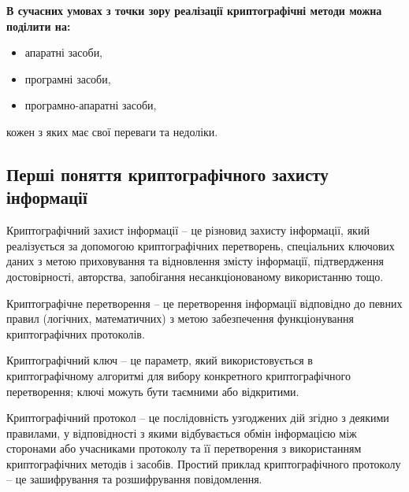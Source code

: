 \textbf{В сучасних умовах з точки зору реалізації криптографічні методи
можна поділити на:}
\begin{itemize}
    \item апаратні засоби,
    \item програмні засоби,
    \item програмно-апаратні засоби,
\end{itemize}

кожен з яких має свої переваги та недоліки. 

\subsection{Перші поняття криптографічного захисту інформації}

\begin{definition}
    Криптографічний захист інформації – це різновид захисту
    інформації, який реалізується за допомогою криптографічних перетворень,
    спеціальних ключових даних з метою приховування та відновлення змісту
    інформації, підтвердження достовірності, авторства, запобігання
    несанкціонованому використанню тощо.
\end{definition}

\begin{definition}
    Криптографічне перетворення – це перетворення інформації
    відповідно до певних правил (логічних, математичних) з метою забезпечення
    функціонування криптографічних протоколів.
\end{definition}

\begin{definition}
    Криптографічний ключ – це параметр, який використовується в
    криптографічному алгоритмі для вибору конкретного криптографічного
    перетворення; ключі можуть бути таємними або відкритими.
\end{definition}

\begin{definition}
    Криптографічний протокол – це послідовність узгоджених дій
    згідно з деякими правилами, у відповідності з якими відбувається обмін
    інформацією між сторонами або учасниками протоколу та її перетворення з
    використанням криптографічних методів і засобів. Простий приклад
    криптографічного протоколу – це зашифрування та розшифрування
    повідомлення.
\end{definition}


